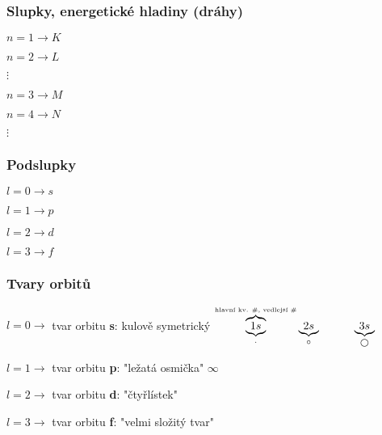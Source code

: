 \documentclass{article}
\begin{document}
\centering
\subsubsection{Slupky, energetické hladiny (dráhy)}
    \begin{multicols}{2}
        $n = 1 \to K$

        $n = 2 \to L$
        
        $\vdots$
        
        $n = 3 \to M$
        
        $n = 4 \to N$

        $\vdots$ 
    \end{multicols}

\centering
\subsubsection{Podslupky}
    \begin{multicols}{2}
        $l = 0 \to s$

        $l = 1 \to p$
        
        $l = 2 \to d$
        
        $l = 3 \to f$
    \end{multicols}


\subsubsection{Tvary orbitů}
    \vspace{2em}
    \raggedright
    \TabPositions{0em, 20em}
    $l = 0 \to$ tvar orbitu \textbf{s}: kulově symetrický
    \tab
    $\overbrace{\underbrace{1s}_{\cdot}}^{\text{\tiny{hlavní kv. \#, vedlejší \#}}}  \underbrace{2s}_{\circ} \hspace{3em} \underbrace{3s}_{\bigcirc}$
    
    \vspace{2em}
    \raggedright
    $l = 1 \to $ tvar orbitu \textbf{p}: "ležatá osmička" \tab \hspace{2em} \huge{$\infty$}

    \normalsize
    
    $l = 2 \to $ tvar orbitu \textbf{d}: "čtyřlístek"
    
    \vspace{2em}

    $l = 3 \to $ tvar orbitu \textbf{f}: "velmi složitý tvar"


\raggedright

\newpage
\TabPositions{0em, 20em}
\end{document}
